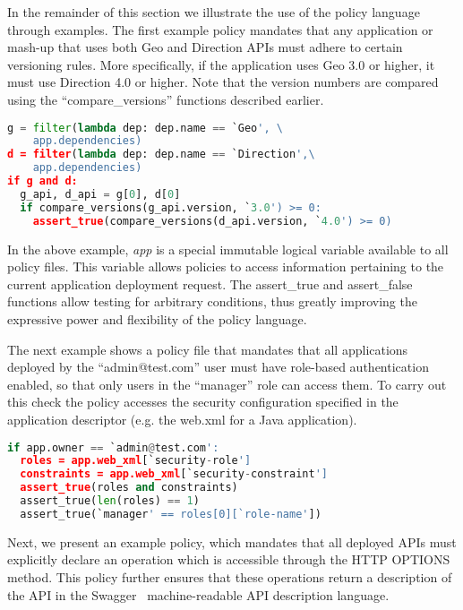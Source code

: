 In the remainder of this section we illustrate the use of the policy language
through examples.
The first example policy mandates that any application or mash-up
that uses both Geo and Direction APIs must adhere to certain versioning 
rules. More specifically, if the application uses Geo 3.0 or higher, it must use
Direction 4.0 or higher. Note that the version numbers are compared using the
``compare\_versions'' functions described earlier.

\vspace{0.05in}
{\footnotesize
\begin{lstlisting}[language=Python, frame=single, showstringspaces=false]
g = filter(lambda dep: dep.name == `Geo', \
	app.dependencies)
d = filter(lambda dep: dep.name == `Direction',\
	app.dependencies)
if g and d:
  g_api, d_api = g[0], d[0]
  if compare_versions(g_api.version, `3.0') >= 0:
    assert_true(compare_versions(d_api.version, `4.0') >= 0)
\end{lstlisting}
}
\vspace{0.05in}

In the above example, \textit{app} is a special immutable logical variable available to
all policy files. This variable allows policies to access information
pertaining to the current application deployment request. The assert\_true and assert\_false
functions allow testing for arbitrary conditions, thus greatly improving the expressive
power and flexibility of the policy language.

The next example shows a policy file that mandates that all applications deployed
by the ``admin@test.com'' user must have role-based authentication enabled, so that only
users in the ``manager'' role can access them. To carry out this check the policy accesses
the security configuration specified in the application descriptor (e.g. the
web.xml for a Java application).

\vspace{0.05in}
{\footnotesize
\begin{lstlisting}[language=Python, frame=single, showstringspaces=false]
if app.owner == `admin@test.com':
  roles = app.web_xml[`security-role']
  constraints = app.web_xml[`security-constraint']
  assert_true(roles and constraints)
  assert_true(len(roles) == 1)
  assert_true(`manager' == roles[0][`role-name'])
\end{lstlisting}
}
\vspace{0.05in}

Next, we present an example policy, which mandates that all deployed APIs must explicitly
declare an operation which is accessible through the HTTP OPTIONS method. This policy further ensures
that these operations return a description of the API in the Swagger~\cite{hl:swagger} machine-readable API
description language.

